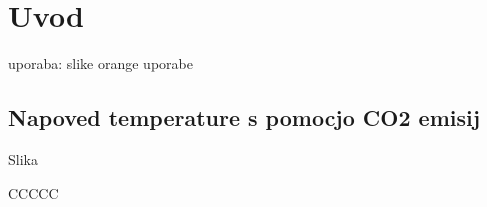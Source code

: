 \chapter{Uvod}

uporaba: slike orange uporabe

\section{Napoved temperature s pomocjo CO2 emisij}

Slika \
% 
% 
% 
% 

CCCCC


